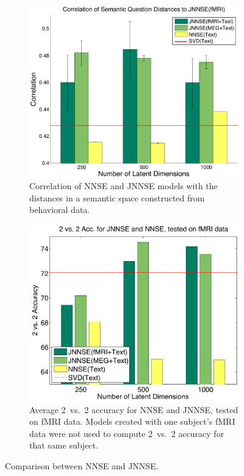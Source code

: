 \begin{figure}[!ht]
    \centering
    \captionsetup{width=.8\linewidth}
    \begin{subfigure}{.49\textwidth}
        \centering
        \captionsetup{width=.8\linewidth}
        \includegraphics[width=.7\linewidth]{images/jnnse.png}
        \caption{Correlation of NNSE and JNNSE models with the distances in a semantic space constructed from behavioral data.}
        \label{fig:jnnse}
    \end{subfigure}
    \begin{subfigure}{.49\textwidth}
        \centering
        \captionsetup{width=.8\linewidth}
        \includegraphics[width=.65\linewidth]{images/jnnse_2.png}
        \caption{Average 2~vs.~2 accuracy for NNSE and JNNSE, tested on fMRI data. Models created with one subject's fMRI data were not used to compute 2~vs.~2 accuracy for that same subject.}
        \label{fig:jnnse_2}
    \end{subfigure}
    \caption{Comparison between NNSE and JNNSE.}
    \label{fig:jnnse_comp}
\end{figure}

